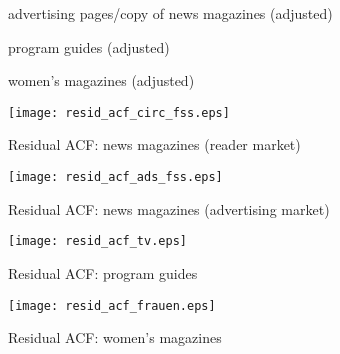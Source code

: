 \documentclass[12pt,a4paper]{scrreprt}
\begin{document}
\begin{appendices}
\begin{figure}[H]
\caption{advertising pages/copy of news magazines (adjusted)}
\begin{minipage}
	\centering
	
\end{minipage}
\hfil
\begin{minipage}
	\centering
	
\end{minipage}
\end{figure}


\begin{figure}[H]
\caption{program guides (adjusted)}
\label{fig_arima_circ_tv}
\begin{minipage}
	\centering
	
\end{minipage}
\hfil
\begin{minipage}
	\centering
	
\end{minipage}
\end{figure}

\begin{figure}[H]
\caption{women's magazines (adjusted)}
\begin{minipage}
	\centering
	
\end{minipage}
\hfil
\begin{minipage}
	\centering
	
\end{minipage}
\end{figure}

\begin{figure}[H]
\caption{Residual ACF: news magazines (reader market)}
	\centering
	\texttt{[image: resid\_acf\_circ\_fss.eps]}
\end{figure}

\begin{figure}[H]
\caption{Residual ACF: news magazines (advertising market)}
	\centering
	\texttt{[image: resid\_acf\_ads\_fss.eps]}
\end{figure}

\begin{figure}[H]
\caption{Residual ACF: program guides}
	\centering
	\texttt{[image: resid\_acf\_tv.eps]}
\end{figure}

\begin{figure}[H]
\caption{Residual ACF: women's magazines}
	\centering
	\texttt{[image: resid\_acf\_frauen.eps]}
\end{figure}


\end{appendices}
\end{document}
